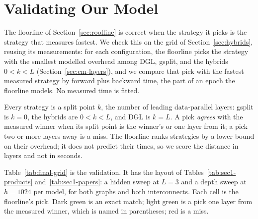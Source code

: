 \providecommand{\flag}[1]{{\color{red}#1}}  %
\section{Validating Our Model}
\label{sec:results}
\label{sec:res-table}

The floorline of Section~\ref{sec:roofline} is correct when the strategy it picks is the strategy
that measures fastest. We check this on the grid of Section~\ref{sec:hybrids}, reusing its
measurements: for each configuration, the floorline picks the strategy with the smallest modelled
overhead among DGL, gsplit, and the hybrids $0<k<L$ (Section~\ref{sec:cm-layers}), and we compare
that pick with the fastest measured strategy by forward plus backward time, the part of an epoch
the floorline models. No measured time is fitted.

Every strategy is a split point $k$, the number of leading data-parallel layers: gsplit is $k{=}0$,
the hybrids are $0<k<L$, and DGL is $k{=}L$. A pick \emph{agrees} with the measured winner when
its split point is the winner's or one layer from it; a pick two or more layers away is a miss.
The floorline ranks strategies by a lower bound on their overhead; it does not predict their times,
so we score the distance in layers and not in seconds.

Table~\ref{tab:final-grid} is the validation. It has the layout of
Tables~\ref{tab:sec1-products} and~\ref{tab:sec1-papers}: a hidden sweep at $L{=}3$ and a depth
sweep at $h{=}1024$ per model, for both graphs and both interconnects. Each cell is the floorline's
pick. Dark green is an exact match; light green is a pick one layer from the measured winner, which
is named in parentheses; red is a miss.

